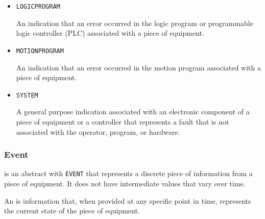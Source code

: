 \begin{itemize}
\item \texttt{LOGIC\textunderscore PROGRAM}  

An indication that an error occurred in the logic program or programmable logic controller (PLC) associated with a piece of equipment.


\item \texttt{MOTION\textunderscore PROGRAM}  

An indication that an error occurred in the motion program associated with a piece of equipment.


\item \texttt{SYSTEM}  

A general purpose indication associated with an electronic component of a piece of equipment or a controller that represents a fault that is not associated with the operator, program, or hardware.

\end{itemize}



\subsubsection{Event}
\label{sec:Event}



 is an abstract  with \texttt{EVENT}  that represents a discrete piece of information from a piece of equipment. It does not have intermediate values that vary over time.

An  is information that, when provided at any specific point in time, represents the current state of the piece of equipment.


